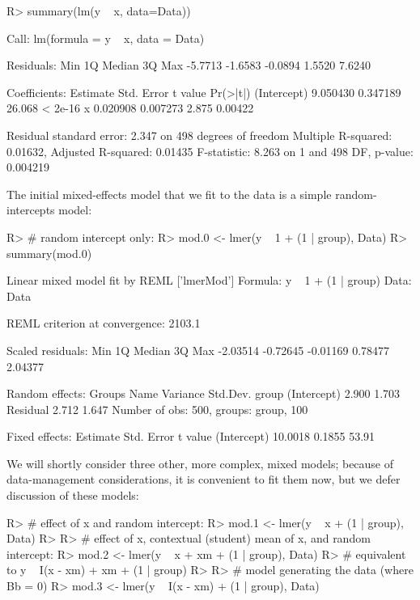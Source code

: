 \documentclass[
]{jss}
\begin{document}
\begin{CodeChunk}
\begin{CodeInput}
R> summary(lm(y ~ x, data=Data))
\end{CodeInput}
\begin{CodeOutput}

Call:
lm(formula = y ~ x, data = Data)

Residuals:
    Min      1Q  Median      3Q     Max 
-5.7713 -1.6583 -0.0894  1.5520  7.6240 

Coefficients:
            Estimate Std. Error t value Pr(>|t|)
(Intercept) 9.050430   0.347189  26.068  < 2e-16
x           0.020908   0.007273   2.875  0.00422

Residual standard error: 2.347 on 498 degrees of freedom
Multiple R-squared:  0.01632,   Adjusted R-squared:  0.01435 
F-statistic: 8.263 on 1 and 498 DF,  p-value: 0.004219
\end{CodeOutput}
\end{CodeChunk}

The initial mixed-effects model that we fit to the data is a simple
random-intercepts model:

\begin{CodeChunk}
\begin{CodeInput}
R> # random intercept only:
R> mod.0 <- lmer(y ~ 1 + (1 | group), Data)
R> summary(mod.0)
\end{CodeInput}
\begin{CodeOutput}
Linear mixed model fit by REML ['lmerMod']
Formula: y ~ 1 + (1 | group)
   Data: Data

REML criterion at convergence: 2103.1

Scaled residuals: 
     Min       1Q   Median       3Q      Max 
-2.03514 -0.72645 -0.01169  0.78477  2.04377 

Random effects:
 Groups   Name        Variance Std.Dev.
 group    (Intercept) 2.900    1.703   
 Residual             2.712    1.647   
Number of obs: 500, groups:  group, 100

Fixed effects:
            Estimate Std. Error t value
(Intercept)  10.0018     0.1855   53.91
\end{CodeOutput}
\end{CodeChunk}

We will shortly consider three other, more complex, mixed models;
because of data-management considerations, it is convenient to fit them
now, but we defer discussion of these models:

\begin{CodeChunk}
\begin{CodeInput}
R> # effect of x and random intercept:
R> mod.1 <- lmer(y ~ x + (1 | group), Data)
R> 
R> # effect of x, contextual (student) mean of x, and random intercept:
R> mod.2 <- lmer(y ~ x + xm + (1 | group), Data)
R>         # equivalent to y ~ I(x - xm) + xm + (1 | group)
R> 
R> # model generating the data (where Bb = 0)
R> mod.3 <- lmer(y ~ I(x - xm) + (1 | group), Data)
\end{CodeInput}
\end{CodeChunk}
\end{document}
